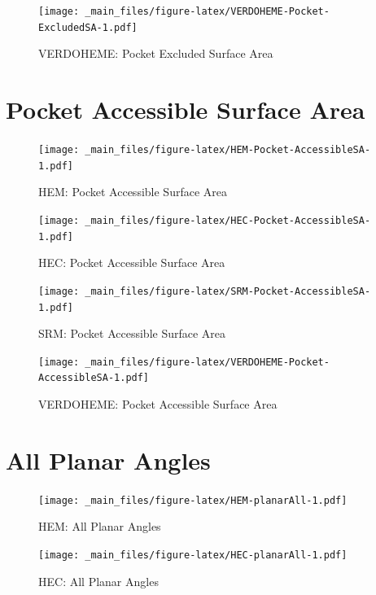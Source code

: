 \documentclass[a4paper, nobind]{templates/ociamthesis}
\begin{document}
\begin{figure}
\centering
\texttt{[image: \_main\_files/figure-latex/VERDOHEME-Pocket-ExcludedSA-1.pdf]}
\caption{\label{fig:VERDOHEME-Pocket-ExcludedSA}VERDOHEME: Pocket Excluded Surface Area}
\end{figure}

\hypertarget{figs-pocketAccSA}{%
\section{Pocket Accessible Surface Area}\label{figs-pocketAccSA}}

\begin{figure}
\centering
\texttt{[image: \_main\_files/figure-latex/HEM-Pocket-AccessibleSA-1.pdf]}
\caption{\label{fig:HEM-Pocket-AccessibleSA}HEM: Pocket Accessible Surface Area}
\end{figure}

\begin{figure}
\centering
\texttt{[image: \_main\_files/figure-latex/HEC-Pocket-AccessibleSA-1.pdf]}
\caption{\label{fig:HEC-Pocket-AccessibleSA}HEC: Pocket Accessible Surface Area}
\end{figure}

\begin{figure}
\centering
\texttt{[image: \_main\_files/figure-latex/SRM-Pocket-AccessibleSA-1.pdf]}
\caption{\label{fig:SRM-Pocket-AccessibleSA}SRM: Pocket Accessible Surface Area}
\end{figure}

\begin{figure}
\centering
\texttt{[image: \_main\_files/figure-latex/VERDOHEME-Pocket-AccessibleSA-1.pdf]}
\caption{\label{fig:VERDOHEME-Pocket-AccessibleSA}VERDOHEME: Pocket Accessible Surface Area}
\end{figure}

\hypertarget{figs-planarAll}{%
\section{All Planar Angles}\label{figs-planarAll}}

\begin{figure}
\centering
\texttt{[image: \_main\_files/figure-latex/HEM-planarAll-1.pdf]}
\caption{\label{fig:HEM-planarAll}HEM: All Planar Angles}
\end{figure}

\begin{figure}
\centering
\texttt{[image: \_main\_files/figure-latex/HEC-planarAll-1.pdf]}
\caption{\label{fig:HEC-planarAll}HEC: All Planar Angles}
\end{figure}
\end{document}
